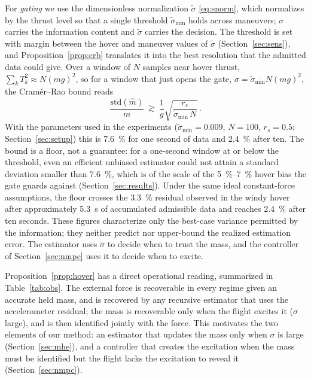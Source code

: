 \documentclass{ieeeaccess}
\begin{document}
For \emph{gating} we use the dimensionless normalization $\tilde\sigma$
\eqref{eq:snorm}, which normalizes by the thrust level so that a single threshold
$\tilde\sigma_{\min}$ holds across maneuvers; $\sigma$ carries the information
content and $\tilde\sigma$ carries the decision. The threshold is set with margin
between the hover and maneuver values of $\tilde\sigma$ (Section~\ref{sec:sens}),
and Proposition~\ref{prop:crb} translates it into the best resolution that the
admitted data could give. Over a window of $N$ samples near hover thrust,
$\sum_k T_k^2\approx N(mg)^2$, so for a window that just opens the gate,
$\sigma=\tilde\sigma_{\min}N(mg)^2$, the Cram\'er--Rao bound reads
\begin{equation}
\frac{\mathrm{std}(\hat m)}{m}\ \gtrsim\ \frac{1}{g}\sqrt{\frac{r_s}{\tilde\sigma_{\min}\,N}}\,.
\label{eq:thrcrb}
\end{equation}
With the parameters used in the experiments ($\tilde\sigma_{\min}=0.009$,
$N=100$, $r_s=0.5$; Section~\ref{sec:setup}) this is \SI{7.6}{\percent} for one second of data and
\SI{2.4}{\percent} after ten. The bound is a floor, not a guarantee: for a
one-second window at or below the threshold, even an efficient unbiased
estimator could not attain a standard deviation smaller than \SI{7.6}{\percent},
which is of the scale of the \SIrange{5}{7}{\percent} hover bias the gate guards
against (Section~\ref{sec:results}). Under the same ideal constant-force
assumptions, the floor crosses the \SI{3.3}{\percent} residual observed in the
windy hover after approximately \SI{5.3}{\second} of accumulated admissible data
and reaches \SI{2.4}{\percent} after ten seconds. These figures characterize only
the best-case variance permitted by the information; they neither predict nor
upper-bound the realized estimation error. The estimator uses
$\tilde\sigma$ to decide when to trust the mass, and the controller of
Section~\ref{sec:nmpc} uses it to decide when to excite.

Proposition~\ref{prop:hover} has a direct operational reading, summarized in
Table~\ref{tab:obs}. The external force is recoverable in every regime given an
accurate held mass, and is
recovered by any recursive estimator that uses the accelerometer residual; the
mass is recoverable only when the
flight excites it ($\sigma$ large), and is then identified jointly with the
force. This motivates the two elements of our method: an estimator that updates
the mass only when $\sigma$ is large (Section~\ref{sec:mhe}), and a controller
that creates the excitation when the mass must be identified but the flight
lacks the excitation to reveal it (Section~\ref{sec:nmpc}).
\end{document}
